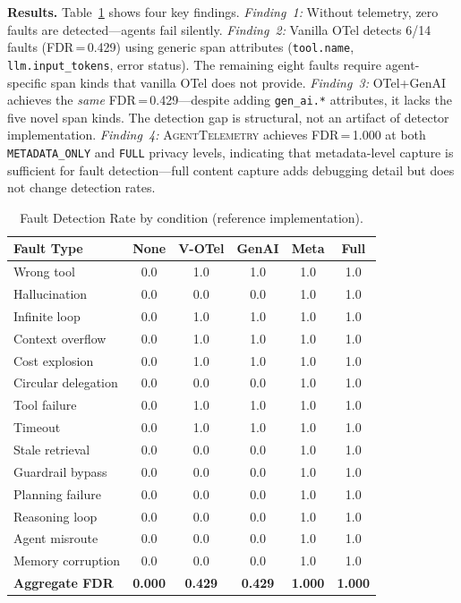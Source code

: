 \documentclass{article}
\begin{document}
\textbf{Results.}  Table~\ref{tab:fdr} shows four key findings.
\emph{Finding~1:} Without telemetry, zero faults are detected---agents
fail silently.
\emph{Finding~2:} Vanilla OTel detects 6/14 faults (FDR\,=\,0.429)
using generic span attributes (\texttt{tool.name},
\texttt{llm.input\_tokens}, error status).  The remaining eight faults
require agent-specific span kinds that vanilla OTel does not provide.
\emph{Finding~3:} OTel+GenAI achieves the \emph{same} FDR\,=\,0.429---despite
adding \texttt{gen\_ai.*} attributes, it lacks the five novel span kinds.
The detection gap is structural, not an artifact of detector implementation.
\emph{Finding~4:} \textsc{AgentTelemetry} achieves FDR\,=\,1.000 at both
\texttt{METADATA\_ONLY} and \texttt{FULL} privacy levels, indicating that
metadata-level capture is sufficient for fault detection---full content
capture adds debugging detail but does not change detection rates.

\begin{table}[t]
\centering
\small
\caption{Fault Detection Rate by condition (reference implementation).}
\label{tab:fdr}
\begin{tabular}{@{}lccccc@{}}
\toprule
\textbf{Fault Type} & \textbf{None} & \textbf{V-OTel} & \textbf{GenAI} & \textbf{Meta} & \textbf{Full} \\
\midrule
Wrong tool          & 0.0 & 1.0 & 1.0 & 1.0 & 1.0 \\
Hallucination       & 0.0 & 0.0 & 0.0 & 1.0 & 1.0 \\
Infinite loop       & 0.0 & 1.0 & 1.0 & 1.0 & 1.0 \\
Context overflow    & 0.0 & 1.0 & 1.0 & 1.0 & 1.0 \\
Cost explosion      & 0.0 & 1.0 & 1.0 & 1.0 & 1.0 \\
Circular delegation & 0.0 & 0.0 & 0.0 & 1.0 & 1.0 \\
Tool failure        & 0.0 & 1.0 & 1.0 & 1.0 & 1.0 \\
Timeout             & 0.0 & 1.0 & 1.0 & 1.0 & 1.0 \\
Stale retrieval     & 0.0 & 0.0 & 0.0 & 1.0 & 1.0 \\
Guardrail bypass    & 0.0 & 0.0 & 0.0 & 1.0 & 1.0 \\
Planning failure    & 0.0 & 0.0 & 0.0 & 1.0 & 1.0 \\
Reasoning loop      & 0.0 & 0.0 & 0.0 & 1.0 & 1.0 \\
Agent misroute      & 0.0 & 0.0 & 0.0 & 1.0 & 1.0 \\
Memory corruption   & 0.0 & 0.0 & 0.0 & 1.0 & 1.0 \\
\midrule
\textbf{Aggregate FDR} & \textbf{0.000} & \textbf{0.429} & \textbf{0.429} & \textbf{1.000} & \textbf{1.000} \\
\bottomrule
\end{tabular}
\end{table}
\end{document}
